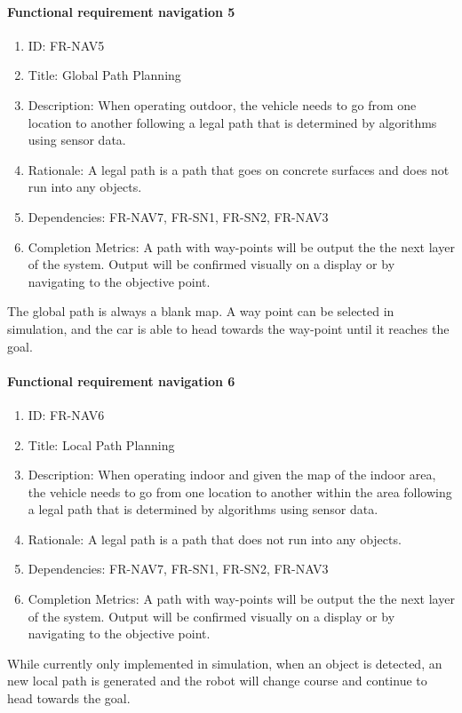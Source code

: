 \documentclass[compsoc,draftclsnofoot,onecolumn,10pt]{IEEEtran}
\begin{document}
	\paragraph{\textbf{Functional requirement navigation 5}}
		\begin{enumerate}
			\item ID: FR-NAV5
			\item Title: Global Path Planning
			\item Description: When operating outdoor, the vehicle needs to go from one location to another following a legal path that is determined by algorithms using sensor data.
			\item Rationale: A legal path is a path that goes on concrete surfaces and does not run into any objects.
			\item Dependencies: FR-NAV7, FR-SN1, FR-SN2, FR-NAV3
			\item Completion Metrics: A path with way-points will be output the the next layer of the system. 
			Output will be confirmed visually on a display or by navigating to the objective point.  
		\end{enumerate}
    The global path is always a blank map. A way point can be selected in simulation, and the car is able to head towards the way-point until it reaches the goal.
    
	\paragraph{\textbf{Functional requirement navigation 6}}
		\begin{enumerate}
			\item ID: FR-NAV6
			\item Title: Local Path Planning
			\item Description: When operating indoor and given the map of the indoor area, the vehicle needs to go from one location to another within the area following a legal path that is determined by algorithms using sensor data.
			\item Rationale: A legal path is a path that does not run into any objects.
			\item Dependencies: FR-NAV7, FR-SN1, FR-SN2, FR-NAV3
			\item Completion Metrics: A path with way-points will be output the the next layer of the system. 
			Output will be confirmed visually on a display or by navigating to the objective point.  
		\end{enumerate}
    While currently only implemented in simulation, when an object is detected, an new local path is generated and the robot will change course and continue to head towards the goal. 
    
\end{document}
